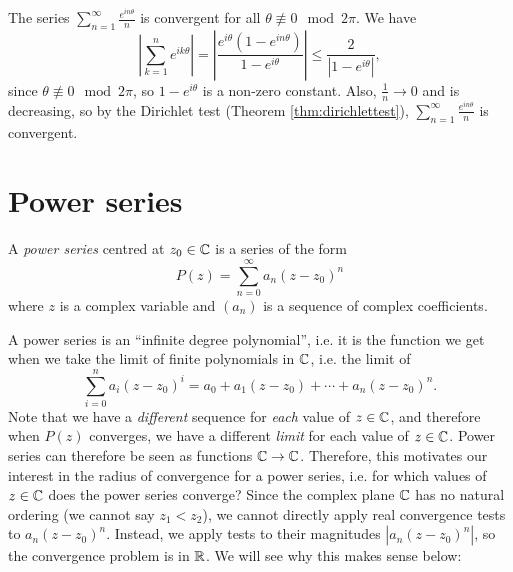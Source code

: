 \documentclass[../analysis1.tex]{subfiles}
\begin{document}
\begin{example}
    The series $\sum_{n=1}^{\infty}\frac{e^{in\theta}}{n}$ is convergent for all $\theta\not\equiv 0\mod 2\pi$. We have \[ \left|\sum_{k=1}^ne^{ik\theta}\right|=\left|\frac{e^{i\theta}\left(1-e^{in\theta}\right)}{1-e^{i\theta}}\right|\le \frac{2}{|1-e^{i\theta}|},\] since $\theta\not\equiv 0\mod 2\pi$, so $1-e^{i\theta}$ is a non-zero constant. Also, $\frac{1}{n}\to 0$ and is decreasing, so by the Dirichlet test (Theorem \ref{thm:dirichlettest}), $\sum_{n=1}^{\infty}\frac{e^{in\theta}}{n}$ is convergent.
\end{example}


\section{Power series}

\begin{definition}
    \begin{shaded*}
        A \textit{power series} centred at $z_0 \in \mathbb{C}$ is a series of the form
        $$ P(z) = \sum_{n=0}^{\infty} a_n (z - z_0)^n $$
        where $z$ is a complex variable and $(a_n)$ is a sequence of complex coefficients.
    \end{shaded*}
\end{definition}

\begin{remark}
    A power series is an ``infinite degree polynomial'', i.e. it is the function we get when we take the limit of finite polynomials in $\mathbb{C}$, i.e. the limit of $$\sum_{i=0}^n a_i (z-z_0)^i=a_0+a_1(z-z_0)+\cdots+a_n(z-z_0)^n.$$ Note that we have a \textit{different} sequence for \textit{each} value of $z\in\mathbb{C}$, and therefore when $P(z)$ converges, we have a different \textit{limit} for each value of $z\in\mathbb{C}$. Power series can therefore be seen as functions $\mathbb{C}\to\mathbb{C}$. Therefore, this motivates our interest in the radius of convergence for a power series, i.e. for which values of $z\in\mathbb{C}$ does the power series converge? Since the complex plane $\mathbb{C}$ has no natural ordering (we cannot say $z_1 < z_2$), we cannot directly apply real convergence tests to $a_n (z-z_0)^n$. Instead, we apply tests to their magnitudes $|a_n (z-z_0)^n|$, so the convergence problem is in $\mathbb{R}$. We will see why this makes sense below:
\end{remark}
\end{document}
